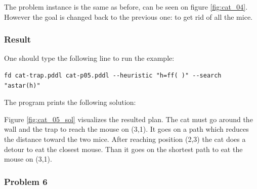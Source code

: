 The problem instance is the same as before, can be seen on figure \ref{fig:cat_04}. However the goal is changed back to the previous one: to get rid of all the mice.




\subsubsection{Result}

One should type the following line to run the example: 

\begin{lstlisting}[numbers=none]
fd cat-trap.pddl cat-p05.pddl --heuristic "h=ff( )" --search "astar(h)"
\end{lstlisting}

The program prints the following solution:



Figure \ref{fig:cat_05_sol} visualizes the resulted plan. The cat must go around the wall and the trap to reach the mouse on (3,1). It goes on a path which reduces the distance toward the two mice. After reaching position (2,3) the cat does a detour to eat the closest mouse. Than it goes on the shortest path to eat the mouse on (3,1).



\subsubsection{Problem 6}

